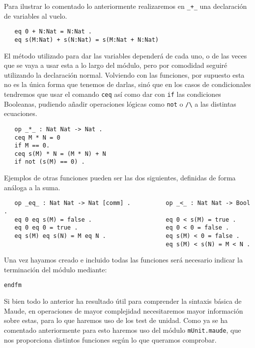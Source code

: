 Para ilustrar lo comentado lo anteriormente realizaremos en \verb"_+_" una declaración de variables al vuelo. \par
{\codesize
\begin{verbatim}
   eq 0 + N:Nat = N:Nat .
   eq s(M:Nat) + s(N:Nat) = s(M:Nat + N:Nat) 
\end{verbatim}
}
 
El método utilizado para dar las variables dependerá de cada uno, o de las veces que se vaya a usar esta a lo largo del módulo, pero por comodidad seguiré utilizando la declaración normal. Volviendo con las funciones, por supuesto esta no es la única forma que tenemos de darlas, sinó que en los casos de condicionales tendremos que usar el comando \texttt{ceq} así como dar con \texttt{if} las condiciones Booleanas, pudiendo añadir operaciones lógicas como \texttt{not} o \verb"/\" a las distintas ecuaciones.\par
{\codesize
\begin{verbatim}
   op _*_ : Nat Nat -> Nat .
   ceq M * N = 0 
   if M == 0.
   ceq s(M) * N = (M * N) + N
   if not (s(M) == 0) .
\end{verbatim}
}

Ejemplos de otras funciones pueden ser las dos siguientes, definidas de forma análoga a la suma.\par

{\codesize
\begin{verbatim}
   op _eq_ : Nat Nat -> Nat [comm] .          op _<_ : Nat Nat -> Bool .
   eq 0 eq s(M) = false .                     eq 0 < s(M) = true .
   eq 0 eq 0 = true .                         eq 0 < 0 = false .
   eq s(M) eq s(N) = M eq N .                 eq s(M) < 0 = false .
                                              eq s(M) < s(N) = M < N .	

\end{verbatim}
}

Una vez hayamos creado e incluido todas las funciones será necesario indicar la terminación del módulo mediante: \par

{\codesize
\begin{verbatim}
endfm
\end{verbatim}
}

Si bien todo lo anterior ha resultado útil para comprender la sintaxis básica de Maude, en operaciones de mayor complejidad necesitaremos mayor información sobre estas, para lo que haremos uso de los test de unidad. Como ya se ha comentado anteriormente para esto haremos uso del módulo \texttt{mUnit.maude}, que nos proporciona distintos funciones según lo que queramos comprobar.\par

